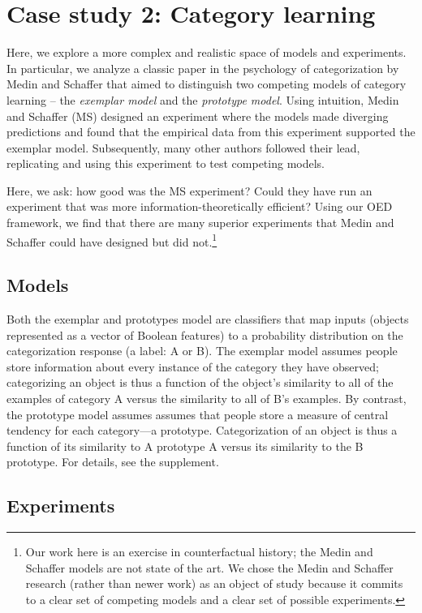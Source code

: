 \documentclass{article}
\begin{document}
\section{Case study 2: Category learning}

Here, we explore a more complex and realistic space of models and experiments.
In particular, we analyze a classic paper in the psychology of categorization by Medin and Schaffer \cite{medin78:pr} that aimed to distinguish two competing models of category learning -- the \emph{exemplar model} and the \emph{prototype model}.
Using intuition, Medin and Schaffer (MS) designed an experiment where the models made diverging predictions and found that the empirical data from this experiment supported the exemplar model.
Subsequently, many other authors followed their lead, replicating and using this experiment to test competing models.

Here, we ask: how good was the MS experiment?
Could they have run an experiment that was more information-theoretically efficient?
Using our OED framework, we find that there are many superior experiments that Medin and Schaffer could have designed but did not.\footnote{Our work here is an exercise in counterfactual history; the Medin and Schaffer models are not state of the art. We chose the Medin and Schaffer research (rather than newer work) as an object of study because it commits to a clear set of competing models and a clear set of possible experiments.}



\subsection{Models}

Both the exemplar and prototypes model are classifiers that map inputs (objects represented as a vector of Boolean features) to a probability distribution on the categorization response (a label: A or B).
The exemplar model assumes people store information about every instance of the category they have observed; categorizing an object is thus a function of the object's similarity to all of the examples of category A versus the similarity to all of B's examples.
By contrast, the prototype model assumes assumes that people store a measure of central tendency for each category---a prototype.
Categorization of an object is thus a function of its similarity to A prototype  A versus its similarity to the B prototype.
For details, see the supplement.

\subsection{Experiments}
\end{document}
